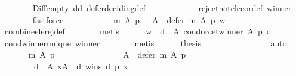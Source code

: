 \begin{isabellebody}
\ \ \ \ \ \ \isamarkupfalse%
\ Diff{\isacharunderscore}{\kern0pt}empty\ dd\ defer{\isacharunderscore}{\kern0pt}deciding{\isacharunderscore}{\kern0pt}def\isanewline
\ \ \ \ \ \ \ \ \ \ \ \ reject{\isacharunderscore}{\kern0pt}not{\isacharunderscore}{\kern0pt}elec{\isacharunderscore}{\kern0pt}or{\isacharunderscore}{\kern0pt}def\ winner\isanewline
\ \ \ \ \ \ \isamarkupfalse%
\ fastforce\isanewline
\ \ \ \ \isamarkupfalse%
\ {}\ {}\ {}\ \isamarkupfalse%
\ {}{\isacharcolon}{\kern0pt}\ {\isachardoublequoteopen}m\ A\ p\ {\isacharequal}{\kern0pt}\ {\isacharparenleft}{\kern0pt}{\isacharbraceleft}{\kern0pt}{\isacharbraceright}{\kern0pt}{\isacharcomma}{\kern0pt}\ A\ {\isacharminus}{\kern0pt}\ defer\ m\ A\ p{\isacharcomma}{\kern0pt}\ {\isacharbraceleft}{\kern0pt}w{\isacharbraceright}{\kern0pt}{\isacharparenright}{\kern0pt}{\isachardoublequoteclose}\isanewline
\ \ \ \ \ \ \isamarkupfalse%
\ combine{\isacharunderscore}{\kern0pt}ele{\isacharunderscore}{\kern0pt}rej{\isacharunderscore}{\kern0pt}def\isanewline
\ \ \ \ \ \ \isamarkupfalse%
\ metis\isanewline
\ \ \ \ \isamarkupfalse%
\ {\isachardoublequoteopen}{\isacharbraceleft}{\kern0pt}w{\isacharbraceright}{\kern0pt}\ {\isacharequal}{\kern0pt}\ {\isacharbraceleft}{\kern0pt}d\ {\isasymin}\ A{\isachardot}{\kern0pt}\ condorcet{\isacharunderscore}{\kern0pt}winner\ A\ p\ d{\isacharbraceright}{\kern0pt}{\isachardoublequoteclose}\isanewline
\ \ \ \ \ \ \isamarkupfalse%
\ cond{\isacharunderscore}{\kern0pt}winner{\isacharunderscore}{\kern0pt}unique{}\ winner\isanewline
\ \ \ \ \ \ \isamarkupfalse%
\ metis\isanewline
\ \ \ \ \isamarkupfalse%
\ {\isacharquery}{\kern0pt}thesis\isanewline
\ \ \ \ \ \ \isamarkupfalse%
\ {\isachardoublequoteopen}{}{\isachardoublequoteclose}\isanewline
\ \ \ \ \ \ \isamarkupfalse%
\ auto\isanewline
\ \ \isamarkupfalse%
\isanewline
\ \ \isamarkupfalse%
\isanewline
\ \ \ \ {\isachardoublequoteopen}m\ A\ p\ {\isacharequal}{\kern0pt}\isanewline
\ \ \ \ \ \ {\isacharparenleft}{\kern0pt}{\isacharbraceleft}{\kern0pt}{\isacharbraceright}{\kern0pt}{\isacharcomma}{\kern0pt}\isanewline
\ \ \ \ \ \ \ \ A\ {\isacharminus}{\kern0pt}\ defer\ m\ A\ p{\isacharcomma}{\kern0pt}\isanewline
\ \ \ \ \ \ \ \ {\isacharbraceleft}{\kern0pt}d\ {\isasymin}\ A{\isachardot}{\kern0pt}\ {\isasymforall}x{\isasymin}A\ {\isacharminus}{\kern0pt}\ {\isacharbraceleft}{\kern0pt}d{\isacharbraceright}{\kern0pt}{\isachardot}{\kern0pt}\ wins\ d\ p\ x{\isacharbraceright}{\kern0pt}{\isacharparenright}{\kern0pt}{\isachardoublequoteclose}\isanewline

\end{isabellebody}
